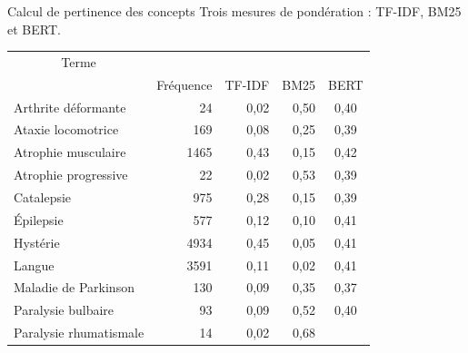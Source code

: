 \begin{frame}{Calcul de pertinence des concepts}
Trois mesures de pondération : \textsc{TF-IDF}, \textsc{BM25} et \textsc{BERT}.
    \footnotesize
\begin{table}[]
\begin{tabular}{|l|cccc|}
\hline
\multicolumn{1}{|c|}{\multirow{}{}{Terme}} & \multicolumn{4}{c|}{\cellcolor{gray!10!white}{ Corpus \textrm{Autres}}}                              \\ \cline{2-5} 
\multicolumn{1}{|c|}{}                       & \multicolumn{1}{c}{{Fréquence}} & \multicolumn{1}{c}{{TF-IDF}} & \multicolumn{1}{c}{{BM25}}  & {BERT} \\ \hline
{Arthrite déformante} &
  \multicolumn{1}{|r|}{{24}} &
  \multicolumn{1}{|r|}{{0,02}} &
  \multicolumn{1}{|r|}{{0,50}} &
  {0,40} \\ \hline
{Ataxie locomotrice} &
  \multicolumn{1}{|r|}{{169}} &
  \multicolumn{1}{|r|}{{0,08}} &
  \multicolumn{1}{|r|}{{0,25}} &
  {0,39} \\ \hline
{Atrophie musculaire} &
  \multicolumn{1}{|r|}{{1465}} &
  \multicolumn{1}{|r|}{{0,43}} &
  \multicolumn{1}{|r|}{{0,15}} &
  {0,42} \\ \hline
{Atrophie progressive} &
  \multicolumn{1}{|r|}{{22}} &
  \multicolumn{1}{|r|}{{0,02}} &
  \multicolumn{1}{|r|}{{0,53}} &
  {0,39} \\ \hline
{Catalepsie} &
  \multicolumn{1}{|r|}{{975}} &
  \multicolumn{1}{|r|}{{0,28}} &
  \multicolumn{1}{|r|}{{0,15}} &
  {0,39} \\ \hline
{Épilepsie} &
  \multicolumn{1}{|r|}{{577}} &
  \multicolumn{1}{|r|}{{0,12}} &
  \multicolumn{1}{|r|}{{0,10}} &
  {0,41} \\ \hline
{Hystérie} &
  \multicolumn{1}{|r|}{{4934}} &
  \multicolumn{1}{|r|}{{0,45}} &
  \multicolumn{1}{|r|}{{0,05}} &
  {0,41} \\ \hline
{Langue} &
  \multicolumn{1}{|r|}{{3591}} &
  \multicolumn{1}{|r|}{{0,11}} &
  \multicolumn{1}{|r|}{{0,02}} &
  {0,41} \\ \hline
{Maladie de Parkinson} &
  \multicolumn{1}{|r|}{{130}} &
  \multicolumn{1}{|r|}{{0,09}} &
  \multicolumn{1}{|r|}{{0,35}} &
  {0,37} \\ \hline
{Paralysie bulbaire} &
  \multicolumn{1}{|r|}{{93}} &
  \multicolumn{1}{|r|}{{0,09}} &
  \multicolumn{1}{|r|}{{0,52}} &
  {0,40} \\ \hline
{Paralysie rhumatismale} &
  \multicolumn{1}{|r|}{{14}} &
  \multicolumn{1}{|r|}{{0,02}} &
  \multicolumn{1}{|r|}{{0,68}} &

\end{tabular}
\end{table}
\end{frame}
